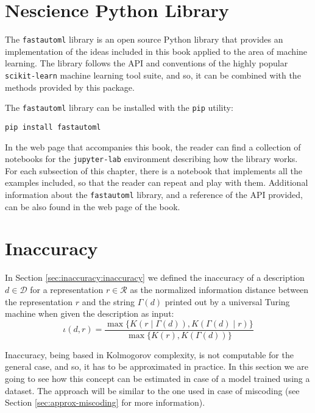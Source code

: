 %
%

\section{Nescience Python Library}

The \texttt{fastautoml} library is an open source Python library that provides an implementation of the ideas included in this book applied to the area of machine learning. The library follows the API and conventions of the highly popular \texttt{scikit-learn} machine learning tool suite, and so, it can be combined with the methods provided by this package.

The \texttt{fastautoml} library can be installed with the \texttt{pip} utility:

\begin{sourcecode}
{\scriptsize \begin{verbatim}
pip install fastautoml
\end{verbatim}}
\end{sourcecode}

In the web page that accompanies this book, the reader can find a collection of notebooks for the \texttt{jupyter-lab} environment describing how the library works. For each subsection of this chapter, there is a notebook that implements all the examples included, so that the reader can repeat and play with them. Additional information about the \texttt{fastautoml} library, and a reference of the API provided, can be also found in the web page of the book.

%
%

\section{Inaccuracy}
\label{sec:machine_learning:inaccuracy}

In Section \ref{sec:inaccuracy:inaccuracy} we defined the inaccuracy of a description $d \in \mathcal{D}$ for a representation $r \in \mathcal{R}$ as the normalized information distance between the representation $r$ and the string $\Gamma(d)$ printed out by a universal Turing machine when given the description as input:
\[
\iota(d, r) = \frac{ \max\{ K \left(r \mid \Gamma(d) \right), K \left( \Gamma(d) \mid r \right) \} } { \max\{ K(r), K \left(\Gamma(d) \right) \} }
\]

Inaccuracy, being based in Kolmogorov complexity, is not computable for the general case, and so, it has to be approximated in practice. In this section we are going to see how this concept can be estimated in case of a model trained using a dataset. The approach will be similar to the one used in case of miscoding (see Section \ref{sec:approx-miscoding} for more information).


